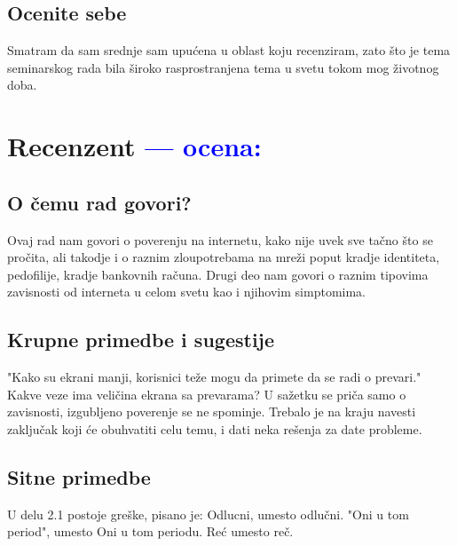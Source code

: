 \documentclass[a4paper]{report}
\newcommand{\odgovor}[1]{\textcolor{blue}{#1}}
\begin{document}
\section{Ocenite sebe}
Smatram da sam srednje sam upućena u oblast koju recenziram, zato što je tema seminarskog rada bila široko rasprostranjena tema u svetu tokom mog životnog doba.

\chapter{Recenzent \odgovor{--- ocena:} }


\section{O čemu rad govori?}


Ovaj rad nam govori o poverenju na internetu, kako nije uvek sve tačno što se pročita, ali takodje i o raznim zloupotrebama na mreži poput kradje identiteta, pedofilije, kradje bankovnih računa. Drugi deo nam govori o raznim tipovima zavisnosti od interneta u celom svetu kao i njihovim simptomima.

\section{Krupne primedbe i sugestije}
"Kako su ekrani manji, korisnici teže mogu da primete da se radi o prevari." Kakve veze ima veličina ekrana sa prevarama?
U sažetku se priča samo o zavisnosti, izgubljeno poverenje se ne spominje. Trebalo je na kraju navesti zaključak koji će obuhvatiti celu temu, i dati neka rešenja za date probleme. 
\section{Sitne primedbe}
U delu 2.1 postoje greške, pisano je:
Odlucni, umesto odlučni.
"Oni u tom period", umesto Oni u tom periodu.
Reć umesto reč.
\end{document}
